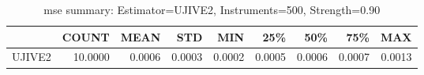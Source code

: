 \begin{table}[ht]
\centering
\caption{mse summary: Estimator=UJIVE2, Instruments=500, Strength=0.90}
\begin{tabular}{lrrrrrrrr}
\toprule
 & COUNT & MEAN & STD & MIN & 25\% & 50\% & 75\% & MAX \\
\midrule
UJIVE2 & 10.0000 & 0.0006 & 0.0003 & 0.0002 & 0.0005 & 0.0006 & 0.0007 & 0.0013 \\
\bottomrule
\end{tabular}
\end{table}
